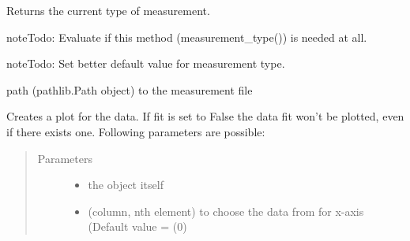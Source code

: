 \documentclass[letterpaper,10pt,english]{sphinxmanual}
\begin{document}
\begin{fulllineitems}
\begin{fulllineitems}
\begin{quote}
\begin{description}
\begin{itemize}
\end{itemize}

\end{description}\end{quote}

Returns the current type of measurement.

\begin{sphinxadmonition}{note}{\label{measurement:index-3}Todo:}
Evaluate if this method (measurement\_type()) is needed at all.
\end{sphinxadmonition}

\begin{sphinxadmonition}{note}{\label{measurement:index-4}Todo:}
Set better default value for measurement type.
\end{sphinxadmonition}

\end{fulllineitems}


\begin{fulllineitems}
\label{\detokenize{measurement:measurement.Measurement.path}}
path (pathlib.Path object) to the measurement file

\end{fulllineitems}


\begin{fulllineitems}
\label{\detokenize{measurement:measurement.Measurement.plot}}
Creates a plot for the data. If fit is set to False the data fit won’t be
plotted, even if there exists one. Following parameters are possible:
\begin{quote}\begin{description}
\item[{Parameters}] \leavevmode\begin{itemize}
\item {} 
 \textendash{} the object itself

\item {} 
 \textendash{} (column, nth element) to choose the data from for x-axis (Default value = (0)


\end{itemize}
\end{description}
\end{quote}
\end{fulllineitems}
\end{fulllineitems}
\end{document}
